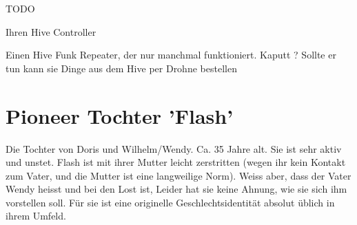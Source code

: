 \begin{npcBox}[title=Doris]
    \begin{stressSection}
    \end{stressSection}
    \begin{tabularx}{\textwidth}{ XX }
    \end{tabularx}

    \begin{consequences}
    \item {}
    \item {}
    \item {}
    \end{consequences}

    \begin{npcDescription}
    TODO
    \end{npcDescription}


    \begin{equipment}
    \item Ihren Hive Controller
    \item Einen Hive Funk Repeater, der nur manchmal funktioniert. Kaputt ? Sollte er tun kann sie Dinge aus dem Hive per Drohne bestellen
    \end{equipment}
\end{npcBox}
\newpage

\section{Pioneer Tochter 'Flash'}

Die Tochter von Doris und Wilhelm/Wendy. Ca. 35 Jahre alt. Sie ist sehr aktiv und unstet. Flash ist mit ihrer Mutter leicht zerstritten (wegen ihr kein Kontakt zum Vater, und die Mutter ist eine langweilige Norm). Weiss aber, dass der Vater Wendy heisst und bei den Lost ist, Leider hat sie keine Ahnung, wie sie sich ihm vorstellen soll. Für sie ist eine originelle Geschlechtsidentität absolut üblich in ihrem Umfeld.

